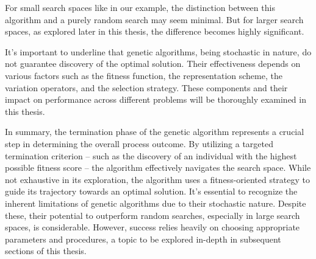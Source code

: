   For small search spaces like in our example, the distinction between this 
  algorithm and a purely random search may seem minimal.
  But for larger search spaces, as explored later in this thesis, the difference
  becomes highly significant.

  It's important to underline that genetic algorithms, being stochastic in 
  nature, do not guarantee discovery of the optimal solution.
  Their effectiveness depends on various factors such as the fitness function, 
  the representation scheme, the variation operators, and the selection 
  strategy.
  These components and their impact on performance across different problems
  will be thoroughly examined in this thesis.

  In summary, the termination phase of the genetic algorithm represents a 
  crucial step in determining the overall process outcome.
  By utilizing a targeted termination criterion -- such as the discovery of an
  individual with the highest possible fitness score -- the algorithm
  effectively navigates the search space.
  While not exhaustive in its exploration, the algorithm uses a fitness-oriented
  strategy to guide its trajectory towards an optimal solution.
  It's essential to recognize the inherent limitations of genetic algorithms due
  to their stochastic nature.
  Despite these, their potential to outperform random searches, especially in
  large search spaces, is considerable.
  However, success relies heavily on choosing appropriate parameters and
  procedures, a topic to be explored in-depth in subsequent sections of this
  thesis.
